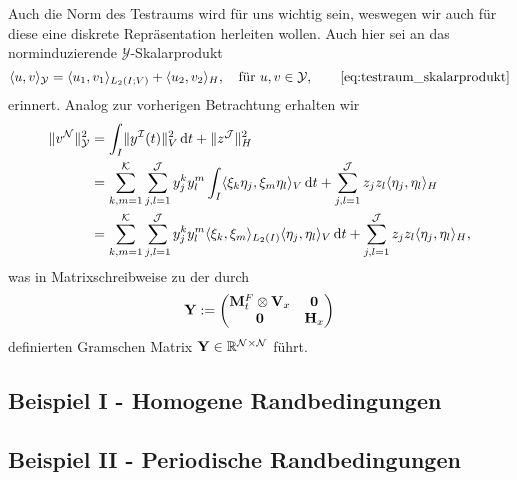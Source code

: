 \documentclass[../main.tex]{subfiles}
\begin{document}
Auch die Norm des Testraums wird für uns wichtig sein, weswegen wir auch für diese eine diskrete Repräsentation herleiten wollen.
Auch hier sei an das norminduzierende $\mathcal Y$-Skalarprodukt
\begin{equation}
    \skp{u}{v}{\mathcal Y} = \skp{u_{1}}{v_{1}}{L_2(I; V)} + \skp{u_{2}}{v_{2}}{H}, \quad \text{für } u, v \in \mathcal Y,
    \tag*{\cref{eq:testraum_skalarprodukt}}
\end{equation}
erinnert.
Analog zur vorherigen Betrachtung erhalten wir
\begin{align}
    \lVert v^{\mathcal N}\rVert_{\mathcal Y}^{2}
    &= \int_{I} \lVert y^{\mathcal I}(t)\rVert_{V}^{2} \mathop{}\!\mathrm{d} t + \lVert z^{\mathcal J}\rVert_{H}^{2}
    \\&= \sum_{k,m = 1}^{\mathcal K} \sum_{j, l = 1}^{\mathcal J} y^{k}_{j} y^{m}_{l} \int_{I} \langle\xi_{k} \eta_{j},\xi_{m} \eta_{l}\rangle_{V} \mathop{}\!\mathrm{d} t + \sum_{j, l = 1}^{\mathcal J} z_{j} z_{l} \langle\eta_{j},\eta_{l}\rangle_{H}
    \\&= \sum_{k,m = 1}^{\mathcal K} \sum_{j, l = 1}^{\mathcal J} y^{k}_{j} y^{m}_{l} \langle\xi_{k},\xi_{m}\rangle_{L_{2}(I)} \langle\eta_{j},\eta_{l}\rangle_{V} \mathop{}\!\mathrm{d} t + \sum_{j, l = 1}^{\mathcal J} z_{j} z_{l} \langle\eta_{j},\eta_{l}\rangle_{H},
\end{align}
was in Matrixschreibweise zu der durch
\begin{equation}
    \mathbf{Y} := \begin{pmatrix}
    \mathbf{M}_{t}^{F} \otimes \mathbf{V}_{x} & \mathbf{0}\\
    \mathbf{0} & \mathbf{H}_{x}
    \end{pmatrix}
\end{equation}
definierten Gramschen Matrix $\mathbf{Y} \in \mathbb{R}^{\mathcal N \times \mathcal N}$ führt.

\subsection{Beispiel I - Homogene Randbedingungen} %
\label{sub:beispiel}


\subsection{Beispiel II - Periodische Randbedingungen} %
\label{sub:beispiel_ii_periodische_randbedingungen}

\end{document}
